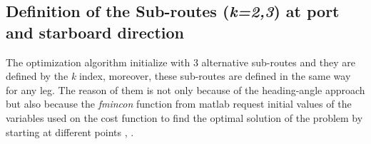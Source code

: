  \subsection{Definition of the Sub-routes (\textit{k=2,3}) at port and starboard direction}

The optimization algorithm initialize with 3 alternative sub-routes and they are defined by the \textit{k} index, moreover, these sub-routes are defined in the same way for any leg. The reason of them is not only because of the heading-angle approach but also because the \textit{fmincon} function from \acrshort{matlab} request initial values of the variables used on the cost function to find the optimal solution of the problem by starting at different points \cite{mitchell2000geometric}, \cite{kelly2015transcription}. \par 

